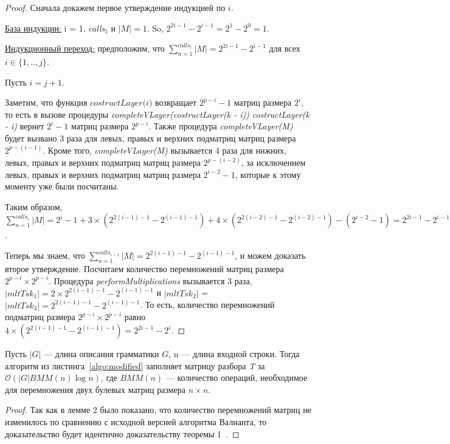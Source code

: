 \begin{proof}

Сначала докажем первое утверждение индукцией по $i$.

\underline{База индукции:} i = 1. \textit{calls$_{1}$} и $|M| = 1$. So, $2^{2i - 1} - 2^{i - 1} = 2^1 - 2^0 = 1$.

\underline{Индукционный переход:} предположим, что $\sum_{n=1}^{calls_i}{|M|} = 2^{2i - 1} - 2^{i - 1}$ для всех $i \in \{ 1, .., j\}$.

Пусть $i = j + 1$.

Заметим, что функция $\textit{costructLayer(i)}$ возвращает $2^{p - i} - 1$ матриц размера $2^i$, то есть в вызове процедуры \textit{completeVLayer(costructLayer(k - i))}  \textit{costructLayer(k - i)} вернет $2^i - 1$ матриц размера $2^{p - i}$.
Также процедура \textit{completeVLayer(M)} будет вызвано 3 раза для левых, правых и верхних подматриц матриц размера $2^{p - (i - 1)}$. Кроме того, \textit{completeVLayer(M)} вызывается 4 раза для нижних, левых, правых и верхних подматриц матриц размера $2^{p - (i - 2)}$, за исключением левых, правых и верхних подматриц матриц размера $2^{i - 2} - 1$, которые к этому моменту уже были посчитаны.

Таким образом, $\sum_{n=1}^{calls_i}{|M|} = 2^{i} - 1 + 3 \times (2^{2(i - 1) - 1} - 2^{(i - 1) - 1}) + 4 \times (2^{2(i - 2) - 1} - 2^{(i - 2) - 1}) - (2^{i - 2} - 1) = 2^{2i - 1} - 2^{i - 1}$.

Теперь мы знаем, что $\sum_{n=1}^{calls_{i-1}}{|M|} = 2^{2(i - 1) - 1} - 2^{(i - 1) - 1}$, и можем доказать второе утверждение. Посчитаем количество перемножений матриц размера $2^{p - i} \times 2^{p - i}$.
Процедура \textit{performMultiplications} вызывается 3 раза, $|mltTsk_1| = 2 \times 2^{2(i - 1) - 1} - 2^{(i - 1) - 1}$ и $|mltTsk_2|$ = $|mltTsk_3| = 2^{2(i - 1) - 1} - 2^{(i - 1) - 1}$. То есть, количество перемножений подматриц размера $2^{p - i} \times 2^{p - i}$ равно $ 4 \times (2^{2(i - 1) - 1} - 2^{(i - 1) - 1}) = 2^{2i - 1} - 2^{i}$.
\end{proof}

\begin{thrm}
Пусть $|G|$ --- длина описания грамматики $G$, n --- длина входной строки. Тогда алгоритм из листинга~\ref{algo:modified} заполняет матрицу разбора \textit{T} за $\mathcal{O}(|G|BMM(n)\log{n})$, где $BMM(n)$ --- количество операций, необходимое для перемножения двух булевых матриц размера $n \times n$.
\end{thrm}

\begin{proof}
Так как в лемме 2 было показано, что количество перемножений матриц не изменилось по сравнению с исходной версией алгоритма Валианта, то доказательство будет идентично доказательству теоремы 1~\cite{Okhotin:2014:PMM:2565359.2565379}.
\end{proof}

